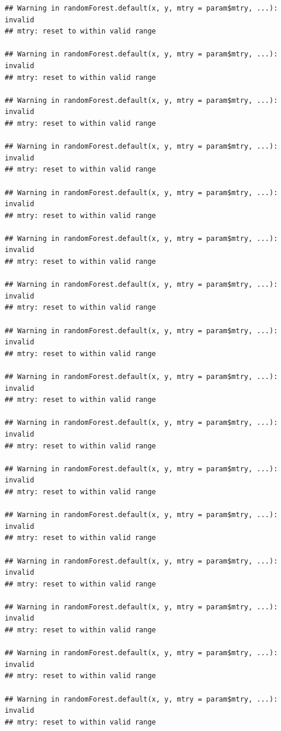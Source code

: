 \documentclass[]{article}
\newenvironment{Shaded}{\begin{snugshade}}{\end{snugshade}}
\newcommand{\CommentTok}[1]{\textcolor[rgb]{0.56,0.35,0.01}{\textit{#1}}}
\newcommand{\DataTypeTok}[1]{\textcolor[rgb]{0.13,0.29,0.53}{#1}}
\newcommand{\DecValTok}[1]{\textcolor[rgb]{0.00,0.00,0.81}{#1}}
\newcommand{\KeywordTok}[1]{\textcolor[rgb]{0.13,0.29,0.53}{\textbf{#1}}}
\newcommand{\NormalTok}[1]{#1}
\newcommand{\OperatorTok}[1]{\textcolor[rgb]{0.81,0.36,0.00}{\textbf{#1}}}
\newcommand{\OtherTok}[1]{\textcolor[rgb]{0.56,0.35,0.01}{#1}}
\newcommand{\StringTok}[1]{\textcolor[rgb]{0.31,0.60,0.02}{#1}}
\begin{document}
\begin{verbatim}
## Warning in randomForest.default(x, y, mtry = param$mtry, ...): invalid
## mtry: reset to within valid range

## Warning in randomForest.default(x, y, mtry = param$mtry, ...): invalid
## mtry: reset to within valid range

## Warning in randomForest.default(x, y, mtry = param$mtry, ...): invalid
## mtry: reset to within valid range

## Warning in randomForest.default(x, y, mtry = param$mtry, ...): invalid
## mtry: reset to within valid range

## Warning in randomForest.default(x, y, mtry = param$mtry, ...): invalid
## mtry: reset to within valid range

## Warning in randomForest.default(x, y, mtry = param$mtry, ...): invalid
## mtry: reset to within valid range

## Warning in randomForest.default(x, y, mtry = param$mtry, ...): invalid
## mtry: reset to within valid range

## Warning in randomForest.default(x, y, mtry = param$mtry, ...): invalid
## mtry: reset to within valid range

## Warning in randomForest.default(x, y, mtry = param$mtry, ...): invalid
## mtry: reset to within valid range

## Warning in randomForest.default(x, y, mtry = param$mtry, ...): invalid
## mtry: reset to within valid range

## Warning in randomForest.default(x, y, mtry = param$mtry, ...): invalid
## mtry: reset to within valid range

## Warning in randomForest.default(x, y, mtry = param$mtry, ...): invalid
## mtry: reset to within valid range

## Warning in randomForest.default(x, y, mtry = param$mtry, ...): invalid
## mtry: reset to within valid range

## Warning in randomForest.default(x, y, mtry = param$mtry, ...): invalid
## mtry: reset to within valid range

## Warning in randomForest.default(x, y, mtry = param$mtry, ...): invalid
## mtry: reset to within valid range

## Warning in randomForest.default(x, y, mtry = param$mtry, ...): invalid
## mtry: reset to within valid range
\end{verbatim}

\begin{Shaded}
\end{Shaded}
\end{document}
